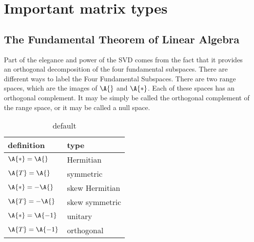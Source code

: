 \chapter{Important matrix types}

\section{The Fundamental Theorem of Linear Algebra}
Part of the elegance and power of the SVD comes from the fact that it provides an orthogonal decomposition of the four fundamental subspaces. There are different ways to label the Four Fundamental Subspaces. There are two range spaces, which are the images of $\A{}$ and $\A{*}$. Each of these spaces has an orthogonal complement. It may be simply be called the orthogonal complement of the range space, or it may be called a null space.

\begin{table}[htdp]
\begin{center}
\begin{tabular}{ll}
%
  definition & type\\ \hline
%
  $\A{*} = \A{}$ & Hermitian \\
  $\A{T} = \A{}$ & symmetric\\
%
  $\A{*} = -\A{}$ & skew Hermitian \\
  $\A{T} = -\A{}$ & skew symmetric \\
%
  $\A{*} = \A{-1}$ & unitary \\
  $\A{T} = \A{-1}$ & orthogonal \\
%
\end{tabular}
\end{center}
\caption{default}
\label{tab:app:matrices:a}
\end{table}%








\endinput
